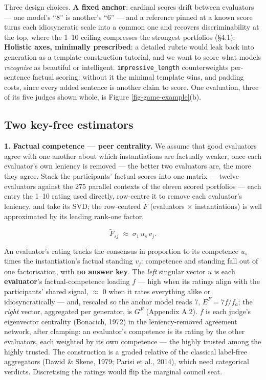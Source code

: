 \documentclass{article}
\begin{document}
Three design choices. \textbf{A fixed anchor}: cardinal scores drift between evaluators --- one model's ``8'' is another's ``6'' --- and a reference pinned at a known score turns each idiosyncratic scale into a common one and recovers discriminability at the top, where the 1--10 ceiling compresses the strongest portfolios (\S{}4.1). \textbf{Holistic axes, minimally prescribed}: a detailed rubric would leak back into generation as a template-construction tutorial, and we want to score what models \emph{recognise} as beautiful or intelligent. \texttt{impressive\_\allowbreak{}length} counterweights per-sentence factual scoring: without it the minimal template wins, and padding costs, since every added sentence is another claim to score. One evaluation, three of its five judges shown whole, is Figure \ref{fig-game-example}(b).

\subsection{Two key-free estimators}\label{two-key-free-estimators}

\textbf{1. Factual competence --- peer centrality.} We assume that good evaluators agree with one another about which instantiations are factually weaker, once each evaluator's own leniency is removed --- the better two evaluators are, the more they agree. Stack the participants' factual scores into one matrix --- twelve evaluators against the 275 parallel contexts of the eleven scored portfolios --- each entry the 1--10 rating used directly, row-centre it to remove each evaluator's leniency, and take its SVD; the row-centred \(\tilde F\) (evaluators \ensuremath{\times} instantiations) is well approximated by its leading rank-one factor,

\[\tilde F_{sj} \;\approx\; \sigma_1\, u_s\, v_j . \tag{1}\]

An evaluator's rating tracks the consensus in proportion to its competence \(u_s\) times the instantiation's factual standing \(v_j\): competence and standing fall out of one factorisation, with \textbf{no answer key}. The \emph{left} singular vector \(u\) is each \textbf{evaluator}'s factual-competence loading \(f\) --- high when its ratings align with the participants' shared signal, \ensuremath{\approx} 0 when it rates everything alike or idiosyncratically --- and, rescaled so the anchor model reads 7, \(E^{F} = 7f/f_a\); the \emph{right} vector, aggregated per generator, is \(G^{F}\) (Appendix A.2). \(f\) is each judge's eigenvector centrality (Bonacich, 1972) in the leniency-removed agreement network, after clamping: an evaluator's competence is its rating by the other evaluators, each weighted by its own competence --- the highly trusted among the highly trusted. The construction is a graded relative of the classical label-free aggregators (Dawid \& Skene, 1979; Parisi et al., 2014), which need categorical verdicts. Discretising the ratings would flip the marginal council seat.
\end{document}
